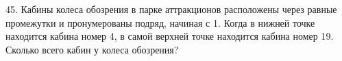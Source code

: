 45. Кабины колеса обозрения в парке аттракционов расположены через равные промежутки и пронумерованы подряд, начиная с 1. Когда в нижней точке находится кабина номер 4, в самой верхней точке находится кабина номер 19. Сколько всего кабин у колеса обозрения?\\
